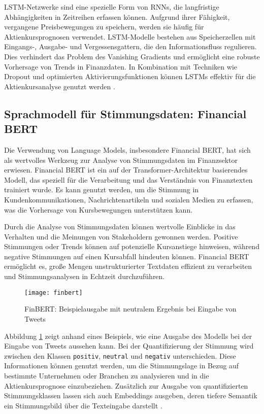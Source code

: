 \ac{LSTM}-Netzwerke sind eine spezielle Form von \acp{RNN}, die langfristige Abhängigkeiten in Zeitreihen erfassen können. Aufgrund ihrer Fähigkeit, vergangene Preisbewegungen zu speichern, werden sie häufig für Aktienkursprognosen verwendet. \ac{LSTM}-Modelle bestehen aus Speicherzellen mit Eingangs-, Ausgabe- und Vergessensgattern, die den Informationsfluss regulieren. Dies verhindert das Problem des Vanishing Gradients und ermöglicht eine robuste Vorhersage von Trends in Finanzdaten. In Kombination mit Techniken wie Dropout und optimierten Aktivierungsfunktionen können \acp{LSTM} effektiv für die Aktienkursanalyse genutzt werden \autocite{hochreiter1997long}\autocite{fischer2018deep}\autocite{siami2019performance}.


\subsection{Sprachmodell für Stimmungsdaten: Financial BERT}\label{sec:data_prep_finbert}

Die Verwendung von Language Models, insbesondere Financial BERT, hat sich als wertvolles Werkzeug zur Analyse von Stimmungsdaten im Finanzsektor erwiesen. Financial BERT ist ein auf der Transformer-Architektur basierendes Modell, das speziell für die Verarbeitung und das Verständnis von Finanztexten trainiert wurde. Es kann genutzt werden, um die Stimmung in Kundenkommunikationen, Nachrichtenartikeln und sozialen Medien zu erfassen, was die Vorhersage von Kursbewegungen unterstützen kann.

Durch die Analyse von Stimmungsdaten können wertvolle Einblicke in das Verhalten und die Meinungen von Stakeholdern gewonnen werden. Positive Stimmungen oder Trends können auf potenzielle Kursanstiege hinweisen, während negative Stimmungen auf einen Kursabfall hindeuten können. Financial BERT ermöglicht es, große Mengen unstrukturierter Textdaten effizient zu verarbeiten und Stimmungsanalysen in Echtzeit durchzuführen.

\begin{figure}[H]
	\centering
	\texttt{[image: finbert]}
	\caption{FinBERT: Beispielausgabe mit neutralem Ergebnis bei Eingabe von Tweets}
	\label{fig:finbert_architecture}
\end{figure}

Abbildung \ref{fig:finbert_architecture} zeigt anhand eines Beispiels, wie eine Ausgabe des Modells bei der Eingabe von Tweets aussehen kann. Bei der Quantifizierung der Stimmung wird zwischen den Klassen \texttt{positiv}, \texttt{neutral} und \texttt{negativ} unterschieden. Diese Informationen können genutzt werden, um die Stimmungslage in Bezug auf bestimmte Unternehmen oder Branchen zu analysieren und in die Aktienkursprognose einzubeziehen. Zusätzlich zur Ausgabe von quantifizierten Stimmungsklassen lassen sich auch Embeddings ausgeben, deren tiefere Semantik ein Stimmungsbild über die Texteingabe darstellt \autocite{devlin2019}\autocite{finbert2019}\autocite{yang2020}.

